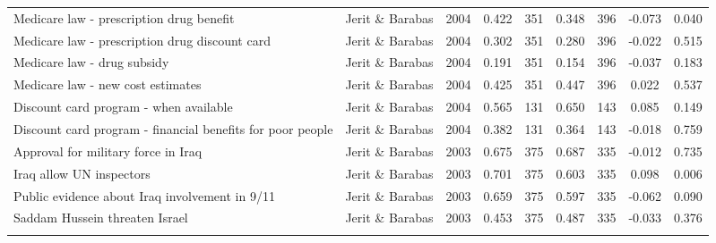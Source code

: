 \begin{longtable}{lllcccccc}
  Medicare law - prescription drug benefit & Jerit \& Barabas & 2004 & 0.422 &  351 & 0.348 &  396 & -0.073 & 0.040 \\ 
  Medicare law - prescription drug discount card & Jerit \& Barabas & 2004 & 0.302 &  351 & 0.280 &  396 & -0.022 & 0.515 \\ 
  Medicare law - drug subsidy & Jerit \& Barabas & 2004 & 0.191 &  351 & 0.154 &  396 & -0.037 & 0.183 \\ 
  Medicare law - new cost estimates & Jerit \& Barabas & 2004 & 0.425 &  351 & 0.447 &  396 & 0.022 & 0.537 \\ 
  Discount card program - when available & Jerit \& Barabas & 2004 & 0.565 &  131 & 0.650 &  143 & 0.085 & 0.149 \\ 
  Discount card program - financial benefits for poor people & Jerit \& Barabas & 2004 & 0.382 &  131 & 0.364 &  143 & -0.018 & 0.759 \\ 
  Approval for military force in Iraq & Jerit \& Barabas & 2003 & 0.675 &  375 & 0.687 &  335 & -0.012 & 0.735 \\ 
  Iraq allow UN inspectors & Jerit \& Barabas & 2003 & 0.701 &  375 & 0.603 &  335 & 0.098 & 0.006 \\ 
  Public evidence about Iraq involvement in 9/11 & Jerit \& Barabas & 2003 & 0.659 &  375 & 0.597 &  335 & -0.062 & 0.090 \\ 
  Saddam Hussein threaten Israel & Jerit \& Barabas & 2003 & 0.453 &  375 & 0.487 &  335 & -0.033 & 0.376 \\ 
   \hline
\hline
\label{tab:indiv_items}
\end{longtable}
\endgroup
